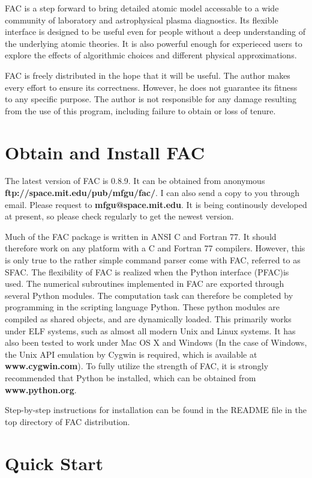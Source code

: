 \documentclass[twoside,letterpaper]{refrep}
\newcommand{\facversion}{{0.8.9}\xspace}
\begin{document}
FAC is a step forward to bring detailed atomic model accessable to a wide
community of laboratory and astrophysical plasma diagnostics. Its flexible
interface is designed to be useful even for people without a deep
understanding of the underlying atomic theories. It is also powerful enough
for experieced users to explore the effects of algorithmic choices and
different physical approximations.

FAC is freely distributed in the hope that it will be useful. The author makes
every effort to ensure its correctness. However, he does not guarantee its
fitness to any specific purpose. The author is not responsible for any damage
resulting from the use of this program, including failure to obtain or loss of
tenure. 

\section{Obtain and Install FAC}
\label{sec:install}
The latest version of FAC is \facversion. It can be obtained from anonymous
\textbf{ftp://space.mit.edu/pub/mfgu/fac/}. I can also send a copy to you
through email. Please request to \textbf{mfgu@space.mit.edu}. It is being
continously developed at present, so please check regularly to get the newest
version.

Much of the FAC package is written in ANSI C and Fortran 77. It should 
therefore work on any platform with a C and Fortran 77 compilers. However, 
this is only true to the rather simple command parser come with FAC, referred 
to as SFAC. The flexibility of FAC is realized when the Python interface
(PFAC)is used. The numerical subroutines implemented in FAC are exported
through several Python modules. The computation task can therefore be
completed by programming in the scripting language Python. These python
modules are compiled as shared objects, and are dynamically loaded. This
primarily works under ELF systems, such as almost all modern Unix and Linux
systems. It has also been tested to work under Mac OS X and Windows (In the
case of Windows, the Unix API emulation by Cygwin is required, which is
available at \textbf{www.cygwin.com}). To fully utilize the strength of  
FAC, it is strongly recommended that Python be installed, which can be obtained
from \textbf{www.python.org}.

Step-by-step instructions for installation can be found in the README file in
the top directory of FAC distribution.

\section{Quick Start}
\label{sec:start}
\end{document}
